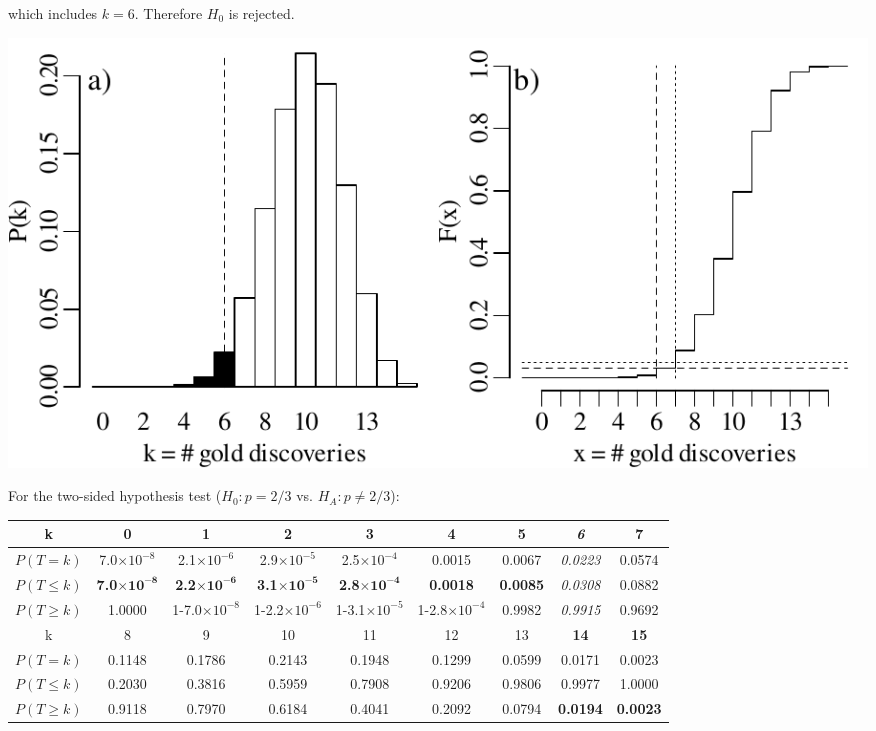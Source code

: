 \noindent which includes $k=6$. Therefore $H_0$ is rejected.

\noindent\begin{minipage}[t][][b]{.6\textwidth}
\includegraphics[width=\textwidth]{../figures/1sidedbinomialrejection15.pdf}
\medskip
\end{minipage}
\begin{minipage}[t][][t]{.4\textwidth}
  \label{fig:1sidedbinomialrejection15}
\end{minipage}

For the two-sided hypothesis test ($H_0: p={2/3}$ vs. $H_{\!A}:
p\neq{2/3}$):

\begin{center}
\begin{tabular}{c@{\gap}c@{\gap}c@{\gap}c@{\gap}c@{\gap}c@{\gap}c@{\gap}c@{\gap}c}
    k & \textbf{0} & \textbf{1} & \textbf{2} & \textbf{3} & \textbf{4}
    & \textbf{5} & \textit{6} & 7 \\ \hline $P(T=k)$ &
    7.0$\times{10}^{-8}$ & 2.1$\times{10}^{-6}$ & 2.9$\times{10}^{-5}$
    & 2.5$\times{10}^{-4}$ & 0.0015 & 0.0067 & \textit{0.0223} & 0.0574 \\
    $P({T}\leq{k})$ & \textbf{7.0}$\mathbf{\times{10}^{-8}}$ &
    \textbf{2.2}$\mathbf{\times{10}^{-6}}$ &
    \textbf{3.1}$\mathbf{\times{10}^{-5}}$ &
    \textbf{2.8}$\mathbf{\times{10}^{-4}}$ & \textbf{0.0018} &
    \textbf{0.0085} & \textit{0.0308} & 0.0882 \\
    $P({T}\geq{k})$ & 1.0000 &
    1-7.0$\times{10}^{-8}$ & 1-2.2$\times{10}^{-6}$ &
    1-3.1$\times{10}^{-5}$ & 1-2.8$\times{10}^{-4}$ & 0.9982 & \textit{0.9915}
    & 0.9692 \\ k & 8 & 9 & 10 & 11 & 12 & 13 & \textbf{14} & \textbf{15} \\ \hline
    $P(T=k)$ & 0.1148 & 0.1786 & 0.2143 & 0.1948
    & 0.1299 & 0.0599 & 0.0171 & 0.0023 \\
    $P({T}\leq{k})$ & 0.2030 &
    0.3816 & 0.5959 & 0.7908 & 0.9206 & 0.9806 & 0.9977 & 1.0000 \\
    $P({T}\geq{k})$ & 0.9118 & 0.7970 & 0.6184 & 0.4041 & 0.2092 &
    0.0794 & \textbf{0.0194} & \textbf{0.0023}
\end{tabular}
\end{center}

